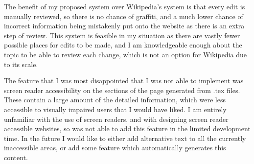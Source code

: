 \documentclass{l4proj}
\begin{document}
The benefit of my proposed system over Wikipedia's system is that every edit is manually reviewed, so there is no chance of graffiti, and a much lower chance of incorrect information being mistakenly put onto the website as there is an extra step of review.  This system is feasible in my situation as there are vastly fewer possible places for edits to be made, and I am knowledgeable enough about the topic to be able to review each change, which is not an option for Wikipedia due to its scale.

The feature that I was most disappointed that I was not able to implement was screen reader accessibility on the sections of the page generated from .tex files.  These contain a large amount of the detailed information, which were less accessible to visually impaired users that I would have liked.  I am entirely unfamiliar with the use of screen readers, and with designing screen reader accessible websites, so was not able to add this feature in the limited development time.  In the future I would like to either add alternative text to all the currently inaccessible areas, or add some feature which automatically generates this content.

%
% 
\end{document}
